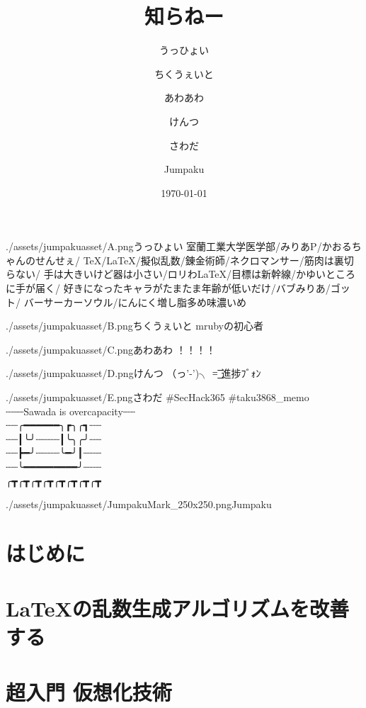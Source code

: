 \documentclass[autodetect-engine,dvipdfmx-if-dvi,ja=standard,a5paper,10.5pt,twoside,openany,layout=v2]{bxjsbook}
\title{知らねー}
\author{うっひょい \and ちくうぇいと \and あわあわ \and けんつ \and さわだ \and Jumpaku}
\date{\today}
\newcommand{\articlepath}{./articles}
\newcommand{\assetspath}{./assets}
\newcommand{\jumpakuasset}{\assetspath/jumpakuasset}
\begin{document}
\frontmatter
\maketitle
\begin{myintroduce}{\jumpakuasset/A.png}{うっひょい}
  室蘭工業大学医学部/みりあP/かおるちゃんのせんせぇ/
  TeX/LaTeX/擬似乱数/錬金術師/ネクロマンサー/筋肉は裏切らない/
  手は大きいけど器は小さい/ロリわLaTeX/目標は新幹線/かゆいところに手が届く/
  好きになったキャラがたまたま年齢が低いだけ/バブみりあ/ゴット/
  バーサーカーソウル/にんにく増し脂多め味濃いめ
\end{myintroduce}
\begin{myintroduce}{\jumpakuasset/B.png}{ちくうぇいと}
  mrubyの初心者
\end{myintroduce}
\begin{myintroduce}{\jumpakuasset/C.png}{あわあわ}
  ！！！！
\end{myintroduce}
\begin{myintroduce}{\jumpakuasset/D.png}{けんつ}
  （っ'-')╮ =͟͟͞͞ 進捗ﾌﾞｫﾝ
\end{myintroduce}
\begin{myintroduce}{\jumpakuasset/E.png}{さわだ}
  \#SecHack365 \#taku3868\_memo \\┈┈┈Sawada is overcapacity┈┈ \\
   ┈┈╭━━━━━━╮┏╮╭┓┈┈ \\
   ┈┈┃╰╯┈┈┈┈┃╰╮╭╯┈┈ \\
   ┈┈┣━╯┈┈┈┈╰━╯┃┈┈┈ \\
   ┈┈╰━━━━━━━━━╯┈┈┈ \\
   ╭┳╭┳╭┳╭┳╭┳╭┳╭┳╭┳
\end{myintroduce}
\begin{myintroduce}{\jumpakuasset/JumpakuMark_250x250.png}{Jumpaku}

\end{myintroduce}

\chapter{はじめに}


\tableofcontents
\mainmatter
{}
\chapter{\LaTeX の乱数生成アルゴリズムを改善する}


\chapter{超入門 仮想化技術}

\end{document}
